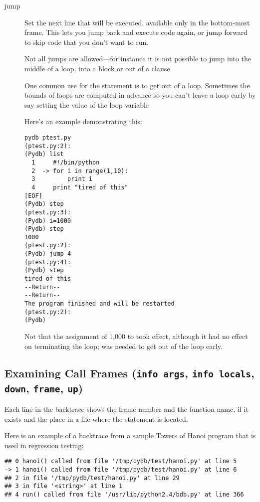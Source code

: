 \begin{description}
\item[jump ]

Set the next line that will be executed. available only in the
bottom-most frame.  This lets you jump back and execute code
again, or jump forward to skip code that you don't want to run.

Not all jumps are allowed---for instance it is not possible to jump
into the middle of a  loop, into a  block or
out of a  clause.

One common use for the  statement is to get out of a
loop. Sometimes the bounds of loops are computed in advance so you
can't leave a loop early by say setting the value of the loop variable

Here's an example demonstrating this:

\begin{verbatim}
pydb ptest.py
(ptest.py:2): 
(Pydb) list
  1  	#!/bin/python
  2  ->	for i in range(1,10):
  3  	    print i
  4  	print "tired of this"
[EOF]
(Pydb) step
(ptest.py:3): 
(Pydb) i=1000
(Pydb) step
1000
(ptest.py:2): 
(Pydb) jump 4
(ptest.py:4): 
(Pydb) step
tired of this
--Return--
--Return--
The program finished and will be restarted
(ptest.py:2): 
(Pydb) 
\end{verbatim}

Not that the assignment of 1,000 to  took effect, although it
had no effect on terminating the  loop;  was
needed to get out of the loop early.

\end{description}

\subsection{Examining Call Frames ({\tt info args}, {\tt info
    locals}, {\tt down}, {\tt frame}, {\tt up})\label{subsection-frames}}

Each line in the backtrace shows the frame number and the function
name, if it exists and the place in a file where the statement is
located.

Here is an example of a backtrace from a sample Towers of Hanoi
program that is used in regression testing:

\begin{verbatim}
## 0 hanoi() called from file '/tmp/pydb/test/hanoi.py' at line 5
-> 1 hanoi() called from file '/tmp/pydb/test/hanoi.py' at line 6
## 2 in file '/tmp/pydb/test/hanoi.py' at line 29
## 3 in file '<string>' at line 1
## 4 run() called from file '/usr/lib/python2.4/bdb.py' at line 366
\end{verbatim}

